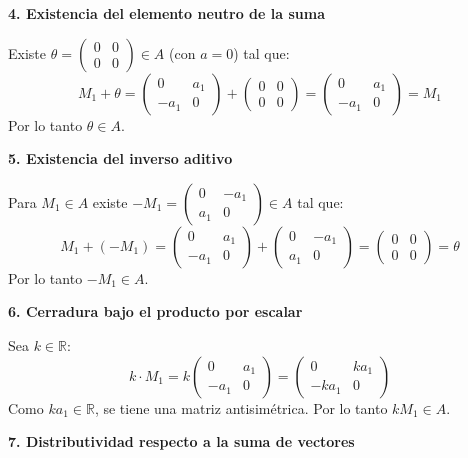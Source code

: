 \documentclass[12pt]{article}
\begin{document}
\begin{enumerate}[label=\alph*.-]
    \textbf{4. Existencia del elemento neutro de la suma}

    Existe $\theta=\begin{pmatrix}0&0\\0&0\end{pmatrix} \in A$ (con $a=0$) tal que:
    \[
    M_1+\theta = \begin{pmatrix}0 & a_1\\ -a_1 & 0\end{pmatrix}+\begin{pmatrix}0&0\\0&0\end{pmatrix} = \begin{pmatrix}0 & a_1\\ -a_1 & 0\end{pmatrix} = M_1
    \]
    Por lo tanto $\theta \in A$.

    \textbf{5. Existencia del inverso aditivo}

    Para $M_1\in A$ existe $-M_1=\begin{pmatrix}0 & -a_1\\ a_1 & 0\end{pmatrix} \in A$ tal que:
    \[
    M_1+(-M_1) = \begin{pmatrix}0 & a_1\\ -a_1 & 0\end{pmatrix}+\begin{pmatrix}0 & -a_1\\ a_1 & 0\end{pmatrix} = \begin{pmatrix}0&0\\0&0\end{pmatrix} = \theta
    \]
    Por lo tanto $-M_1 \in A$.

    \textbf{6. Cerradura bajo el producto por escalar}

    Sea $k \in \mathbb{R}$:
    \[
    k\cdot M_1 = k\begin{pmatrix}0 & a_1\\ -a_1 & 0\end{pmatrix} = \begin{pmatrix}0 & ka_1\\ -ka_1 & 0\end{pmatrix}
    \]
    Como $ka_1 \in \mathbb{R}$, se tiene una matriz antisimétrica. Por lo tanto $kM_1 \in A$.

    \textbf{7. Distributividad respecto a la suma de vectores}


\end{enumerate}
\end{document}
